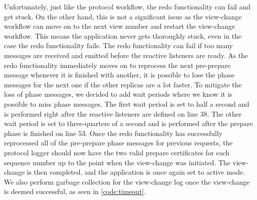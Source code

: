 Unfortunately, just like the protocol workflow, the redo functionality can fail and get stuck. On the other hand, this is not a significant issue as the view-change workflow can move on to the next view number and restart the view-change workflow. This means the application never gets thoroughly stuck, even in the case the redo functionality fails. The redo functionality can fail if too many messages are received and emitted before the reactive listeners are ready. As the redo functionality immediately moves on to reprocess the next pre-prepare message whenever it is finished with another, it is possible to lose the phase messages for the next one if the other replicas are a lot faster. To mitigate the loss of phase messages, we decided to add wait periods where we know it is possible to miss phase messages. The first wait period is set to half a second and is performed right after the reactive listeners are defined on line 38. The other wait period is set to three-quarters of a second and is performed after the prepare phase is finished on line 53. Once the redo functionality has successfully reprocessed all of the pre-prepare phase messages for previous requests, the protocol logger should now have the two valid prepare certificates for each sequence number up to the point when the view-change was initiated. The view-change is then completed, and the application is once again set to active mode. We also perform garbage collection for the view-change log once the view-change is deemed successful, as seen in \autoref{code:timeout}.
\fi
\iffalse
